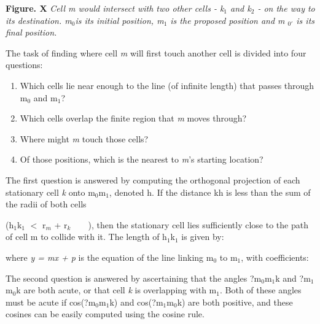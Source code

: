\documentclass[11.5pt]{article}
\begin{document}
{\bfseries Figure. X }{\itshape Cell m would intersect with two other 
cells - k$_{1}$ and k$_{2}$ - on the way to its destination. m$_{
0 }$is its initial position, m$_{1}$ is the proposed position and m
$_{0'}$ is its final position.}



The task of finding where cell {\itshape m} will first touch another 
cell is divided into four questions:

\begin{enumerate}
\item Which cells lie near enough to the line (of infinite length) that 
passes through m$_{0}$ and m$_{1}$?
\item Which cells overlap the finite region that {\itshape m }moves 
through?
\item Where might {\itshape m} touch those cells?
\item Of those positions, which is the nearest to {\itshape m}'s 
starting location?
\setcounter{numberedCntA}{\theenumi}
\end{enumerate}


The first question is answered by computing the orthogonal projection of 
each stationary cell {\itshape k} onto m$_{0}$m$_{1}$, denoted 
h. If the distance kh is less than the sum of the radii of both cells 

\newpage




(h$_{1}$k$_{1}$ $<$ r$_{m}$ + r$_{k}$\ \ \ \ ), then the 
stationary cell lies sufficiently close to the path of cell m to collide 
with it. The length of h$_{1}$k$_{1}$ is given by:

\begin{figure}[H]
\centering
\end{figure}


where {\itshape y = mx + p }is the equation of the line linking m$_{0
}$ to m$_{1}$, with coefficients:

\begin{figure}[H]
\centering
\end{figure}




The second question is answered by ascertaining that the angles ?m$_{0
}$m$_{1}$k and ?m$_{1}$m$_{0}$k are both acute, or that 
cell {\itshape k} is overlapping with m$_{1}$. Both of these angles 
must be acute if cos(?m$_{0}$m$_{1}$k) and cos(?m$_{1}$m$_{
0}$k) are both positive, and these cosines can be easily computed 
using the cosine rule.
\end{document}
